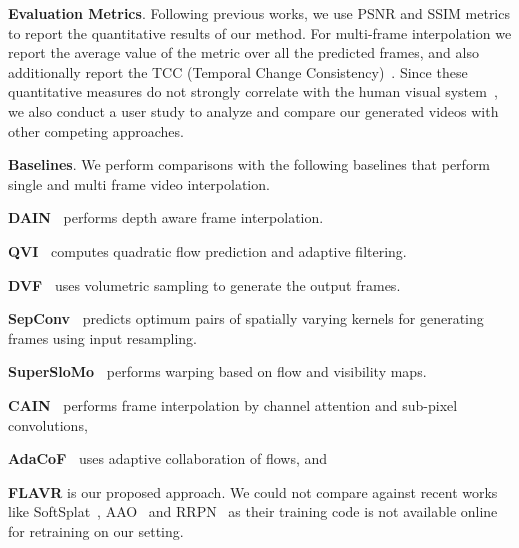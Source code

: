 \documentclass[10pt,twocolumn,letterpaper]{article}
\newcommand{\Ours}{FLAVR}
\begin{document}
%
 

{\bf Evaluation Metrics}. Following previous works, we use PSNR and SSIM metrics to report the quantitative results of our method. For multi-frame interpolation we report the average value of the metric over all the predicted frames, and also additionally report the TCC (Temporal Change Consistency)~\cite{chi2020all}. Since these quantitative measures do not strongly correlate with the human visual system~\cite{nilsson2020understanding}, we also conduct a user study to analyze and compare our generated videos with other competing approaches. 

{\bf Baselines}.
We perform comparisons with the following baselines that perform single and multi frame video interpolation.
\begin{enumerate*}[label=(\roman*)]
  \item \textbf{DAIN~\cite{bao2019depth}} performs depth aware frame interpolation. 
\item \textbf{QVI~\cite{xu2019quadratic}} computes quadratic flow prediction and adaptive filtering.
\item \textbf{DVF~\cite{liu2017video}} uses volumetric sampling to generate the output frames.
\item \textbf{SepConv~\cite{niklaus2017video}} predicts optimum pairs of spatially varying kernels for generating frames using input resampling. 
\item \textbf{SuperSloMo~\cite{jiang2018super}} performs warping based on flow and visibility maps.
\item \textbf{CAIN~\cite{choi2020channel}} performs frame interpolation by channel attention and sub-pixel convolutions, 
\item \textbf{AdaCoF~\cite{lee2020adacof}} uses adaptive collaboration of flows, and
\item \textbf{\Ours{}} is our proposed approach. We could not compare against recent works like SoftSplat~\cite{niklaus2020softmax}, AAO~\cite{chi2020all} and RRPN~\cite{zhang2020flexible} as their training code is not available online for retraining on our setting.
\end{enumerate*}
\end{document}
